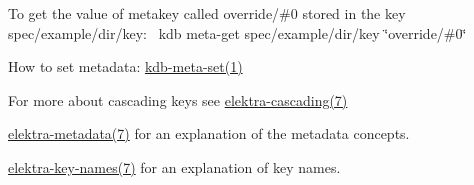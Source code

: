 To get the value of metakey called {\ttfamily override/\#0} stored in the key {\ttfamily spec/example/dir/key}\+:~\newline
 {\ttfamily kdb meta-\/get spec/example/dir/key \char`\"{}override/\#0\char`\"{}}


\begin{DoxyItemize}
\item How to set metadata\+: \hyperlink{doc_help_kdb-meta-set_md}{kdb-\/meta-\/set(1)}
\item For more about cascading keys see \hyperlink{doc_help_elektra-cascading_md}{elektra-\/cascading(7)}
\item \hyperlink{doc_help_elektra-metadata_md}{elektra-\/metadata(7)} for an explanation of the metadata concepts.
\item \hyperlink{doc_help_elektra-key-names_md}{elektra-\/key-\/names(7)} for an explanation of key names. 
\end{DoxyItemize}
